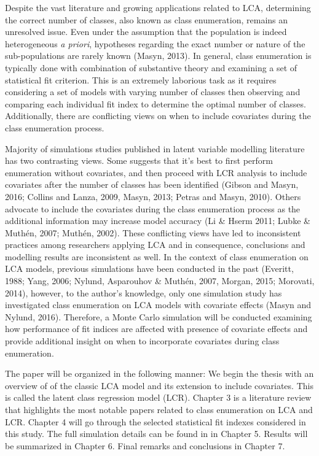 Despite the vast literature and growing applications related to LCA, determining the correct number of classes, also known as class enumeration, remains an unresolved issue. Even under the assumption that the population is indeed heterogeneous \textit{a priori}, hypotheses regarding the exact number or nature of the sub-populations are rarely known (Masyn, 2013). In general, class enumeration is typically done with combination of substantive theory and examining a set of statistical fit criterion. This is an extremely laborious task as it requires considering a set of models with varying number of classes then observing and comparing each individual fit index to determine the optimal number of classes. Additionally, there are conflicting views on when to include covariates during the class enumeration process. 

Majority of simulations studies published in latent variable modelling literature has two contrasting views. Some suggests that it's best to first perform enumeration without covariates, and then proceed with LCR analysis to include covariates after the number of classes has been identified (Gibson and Masyn, 2016; Collins and Lanza, 2009, Masyn, 2013; Petras and Masyn, 2010). Others advocate to include the covariates during the class enumeration process as the additional information may increase model accuracy (Li \& Hserm 2011; Lubke \& Muth\'en, 2007; Muth\'en, 2002). These conflicting views have led to inconsistent practices among researchers applying LCA and in consequence, conclusions and modelling results are inconsistent as well. In the context of class enumeration on LCA models, previous simulations have been conducted in the past (Everitt, 1988; Yang, 2006; Nylund, Asparouhov \& Muth\'en, 2007, Morgan, 2015; Morovati, 2014), however, to the author's knowledge, only one simulation study has investigated class enumeration on LCA models with covariate effects (Masyn and Nylund, 2016). Therefore, a Monte Carlo simulation will be conducted examining how performance of fit indices are affected with presence of covariate effects and provide additional insight on when to incorporate covariates during class enumeration. 

The paper will be organized in the following manner: We begin the thesis with an overview of of the classic LCA model and its extension to include covariates. This is called the latent class regression model (LCR). Chapter 3 is a literature review that highlights the most notable papers related to class enumeration on LCA and LCR. Chapter 4 will go through the selected statistical fit indexes considered in this study. The full simulation details can be found in in Chapter 5. Results will be summarized in Chapter 6. Final remarks and conclusions in Chapter 7. 






